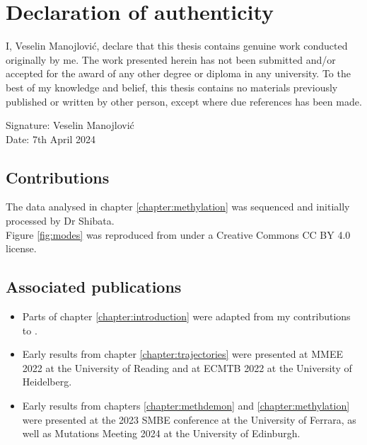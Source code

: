 \chapter*{Declaration of authenticity}

I, Veselin Manojlovi\'c, declare that this thesis contains genuine work
conducted originally by me. The work presented herein has not been submitted
and/or accepted for the award of any other degree or diploma in any university.
To the best of my knowledge and belief, this thesis contains no materials
previously published or written by other person, except where due references
has been made.\par
Signature: Veselin Manojlovi\'c \\
Date: 7th April 2024

\section*{Contributions}
The data analysed in chapter \ref{chapter:methylation} was sequenced and
initially processed by Dr Shibata. \\

Figure \ref{fig:modes} was reproduced from \cite{davis_tumor_2017} under a
Creative Commons CC BY 4.0 license. \par

\section*{Associated publications}
\begin{itemize}
    \item Parts of chapter \ref{chapter:introduction} were adapted from my
        contributions to \cite{lemant_robust_2022}.
    \item Early results from chapter \ref{chapter:trajectories} were presented
        at MMEE 2022 at the University of Reading and at ECMTB 2022 at the
        University of Heidelberg.
    \item Early results from chapters \ref{chapter:methdemon} and
        \ref{chapter:methylation} were presented at the 2023 SMBE conference at
        the University of Ferrara, as well as Mutations Meeting 2024 at the
        University of Edinburgh.
\end{itemize}
